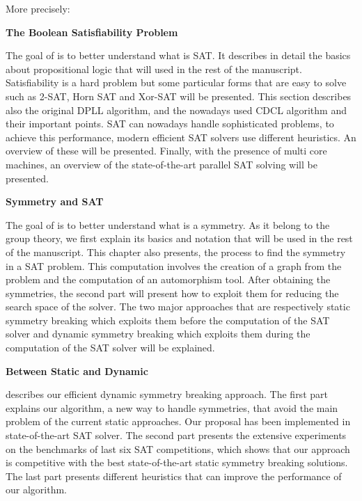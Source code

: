 More precisely:
 
\textbf{The Boolean Satisfiability Problem}

The goal of  is to better understand what is SAT. It describes in detail
the basics about propositional logic that will used in the rest of the manuscript.
Satisfiability is a hard problem but some particular forms that are easy to solve such as 2-SAT, Horn SAT and Xor-SAT will be presented.
This section describes also the original DPLL algorithm, and the nowadays used CDCL algorithm and their  important points.
SAT can nowadays handle sophisticated problems, to achieve this performance, modern efficient 
SAT solvers use different heuristics. An overview of these will be presented.
Finally, with the presence of multi core machines, an overview of the state-of-the-art parallel SAT solving
will be presented.


 


\textbf{Symmetry and SAT}

The goal of  is to better understand what is a symmetry. As it belong to the 
group theory, we first explain its basics and notation that will be used in the rest of the manuscript.
This chapter also presents, the process to find the symmetry in a SAT problem. This computation
involves the creation of a graph from the problem and the computation of an automorphism tool.
After obtaining the symmetries, the second part will present how to exploit them for reducing 
the search space of the solver. The two major approaches that are respectively static symmetry breaking
which exploits them before the computation of the SAT solver and dynamic symmetry breaking which exploits them
during the computation of the SAT solver will be explained.
 

\textbf{Between Static and Dynamic}

 describes our efficient dynamic symmetry breaking approach.
The first part explains our algorithm, a new way to handle symmetries, that avoid the main problem
of the current static approaches. Our proposal has been implemented in state-of-the-art
SAT solver. The second part presents the extensive experiments on the benchmarks of last six SAT competitions,
which shows that our approach is competitive with the best state-of-the-art static symmetry breaking solutions.
The last part presents different heuristics that can improve the performance of our algorithm.



